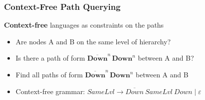 \documentclass[xcolor=table,aspectratio=169]{beamer}
\begin{document}
\begin{frame} \frametitle{Context-Free Path Querying}
  \begin{minipage}[m]{0.45\linewidth}
  \end{minipage}\hfill
  \begin{minipage}[m]{0.5\linewidth}
  \textbf{Context-free} languages as constraints on the paths
  \begin{itemize}
        \item Are nodes A and B on the same level of hierarchy?
        \item Is there a path of form $\overline{\textbf{Down}}^n \, \textbf{Down}^n$ between A and B?
        \item Find all paths of form $\overline{\textbf{Down}}^n \, \textbf{Down}^n$ between A and B
        
        \item Context-free grammar: $\textit{SameLvl} \to \overline{\textit{Down}} \ \textit{SameLvl} \ \textit{Down} \mid \varepsilon$
  \end{itemize}

  \end{minipage}

  \end{frame}

\end{document}
